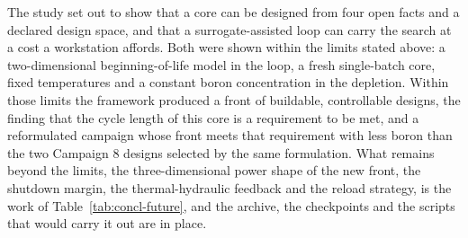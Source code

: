 The study set out to show that a core can be designed from four open
facts and a declared design space, and that a surrogate-assisted loop
can carry the search at a cost a workstation affords. Both were shown
within the limits stated above: a two-dimensional beginning-of-life
model in the loop, a fresh single-batch core, fixed temperatures and a
constant boron concentration in the depletion. Within those limits the
framework produced a front of buildable, controllable designs, the
finding that the cycle length of this core is a requirement to be met,
and a reformulated campaign whose front meets that requirement with
less boron than the two Campaign 8 designs selected by the same
formulation. What remains beyond the limits, the three-dimensional power
shape of the new front, the shutdown margin, the thermal-hydraulic
feedback and the reload strategy, is the work of
Table~\ref{tab:concl-future}, and the archive, the checkpoints and the
scripts that would carry it out are in place.
